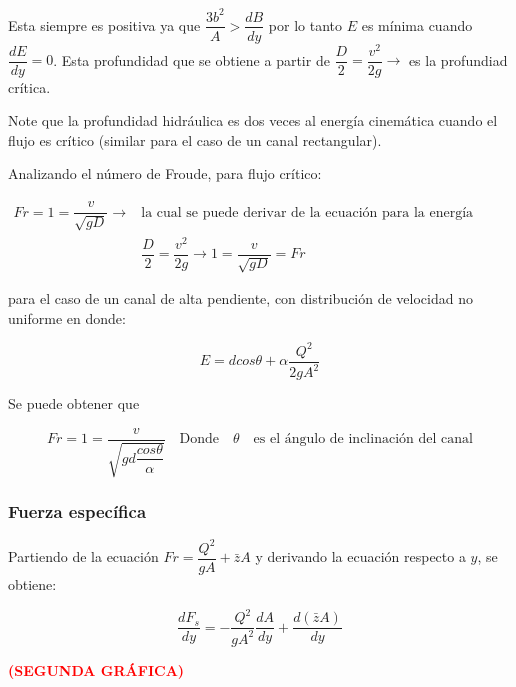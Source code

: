 \documentclass[11pt, oneside]{article}
\begin{document}
Esta siempre es positiva ya que $\dfrac{3b^{2}}{A}>\dfrac{dB}{dy}$ por lo tanto $E$ es mínima cuando $\dfrac{dE}{dy}=0$. Esta profundidad que se obtiene a partir de $\dfrac{D}{2}=\dfrac{v^{2}}{2g}\rightarrow$ es la profundiad crítica. \vspace{1ex}

Note que la profundidad hidráulica es dos veces al energía cinemática cuando el flujo es crítico (similar para el caso de un canal rectangular).

Analizando el número de Froude, para flujo crítico:

\begin{equation}
    \begin{aligned}
        Fr=1=\dfrac{v}{\sqrt{gD}} \rightarrow& \text{la cual se puede derivar de la ecuación para la energía mínima}\\ 
        &\dfrac{D}{2}=\dfrac{v^{2}}{2g} \rightarrow 1 = \dfrac{v}{\sqrt{gD}}=Fr
    \end{aligned} 
\end{equation}

para el caso de un canal de alta pendiente, con distribución de velocidad no uniforme en donde:

\begin{equation}
    E=dcos\theta+\alpha	\dfrac{Q^{2}}{2gA^{2}}
\end{equation}

Se puede obtener que

\begin{equation}
    Fr=1=\dfrac{v}{\sqrt{gd\dfrac{cos\theta}{\alpha}}} \quad \text{Donde} \quad \theta \quad \text{es el ángulo de inclinación del canal}
\end{equation}


\subsubsection{Fuerza específica}

Partiendo de la ecuación $Fr=\dfrac{Q^{2}}{gA}+\bar{z}A$ y derivando la ecuación respecto a $y$, se obtiene:

\begin{equation}
    \dfrac{dF_{s}}{dy}=-\dfrac{Q^{2}}{gA^{2}}\dfrac{dA}{dy}+\dfrac{d(\bar{z}A)}{dy}
\end{equation}

\textcolor{red}{\textbf{(SEGUNDA GRÁFICA)}} \vspace{1ex}

\end{document}
